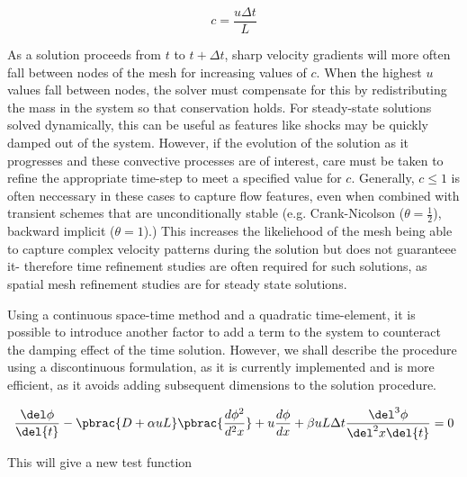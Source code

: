\begin{equation}
 c=\frac{u\Delta{t}}{L}
\end{equation}

As a solution proceeds from $t$ to $t+\Delta{t}$, sharp velocity gradients will more often fall between nodes of the mesh for increasing values of $c$. When the highest $u$ values fall between nodes, the solver must compensate for this by redistributing the mass in the system so that conservation holds. For steady-state solutions solved dynamically, this can be useful as features like shocks may be quickly damped out of the system. However, if the evolution of the solution as it progresses and these convective processes are of interest, care must be taken to refine the appropriate time-step to meet a specified value for $c$. Generally, $c\le{1}$ is often neccessary in these cases to capture flow features, even when combined with transient schemes that are unconditionally stable (e.g. Crank-Nicolson ($\theta=\frac{1}{2}$), backward implicit ($\theta=1$).) This increases the likeliehood of the mesh being able to capture complex velocity patterns during the solution but does not guaranteee it- therefore time refinement studies are often required for such solutions, as spatial mesh refinement studies are for steady state solutions. 


Using a continuous space-time method and a quadratic time-element, it is possible to introduce another factor to add a term to the system to counteract the damping effect of the time solution. However, we shall describe the procedure using a discontinuous formulation, as it is currently implemented and is more efficient, as it avoids adding subsequent dimensions to the solution procedure. 

\begin{equation}
  \frac{\del\phi}{\del{t}}-\pbrac{D+{\alpha}uL}\pbrac{\frac{d\phi^2}{d^2x}}+u\frac{d\phi}{dx}+\beta{uL\Delta{t}}\frac{\del^3\phi}{\del^2{x}\del{t}}=0
\end{equation}

This will give a new test function 

